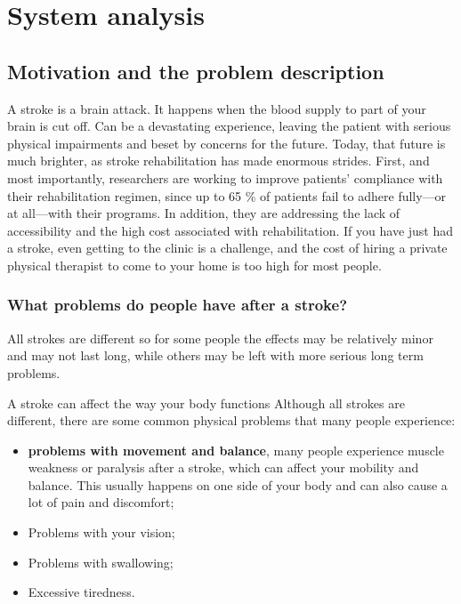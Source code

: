 \section{System analysis}

\subsection{Motivation and the problem description}
A stroke\cite{whatisstroke} is a brain attack. It happens when the blood supply to part of your brain is cut off. Can be a devastating experience, leaving the patient with serious physical impairments and beset by concerns for the future. Today, that future is much brighter, as stroke rehabilitation has made enormous strides. 
First, and most importantly, researchers are working to improve patients’ compliance with their rehabilitation regimen, since up to 65 \% \cite{assesment} of patients fail to adhere fully—or at all—with their programs. In addition, they are addressing the lack of accessibility and the high cost associated with rehabilitation. If you have just had a stroke, even getting to the clinic is a challenge, and the cost of hiring a private physical therapist to come to your home is too high for most people.

\subsubsection{What problems do people have after a stroke?}

All strokes are different so for some people the effects may be relatively minor and may not last long, while others may be left with more serious long term problems.

A stroke can affect the way your body functions
Although all strokes are different, there are some common physical problems that many people experience:

\begin{itemize}
\item \textbf{problems with movement and balance}, many people experience muscle weakness or paralysis after a stroke, which can affect your mobility and balance. This usually happens on one side of your body and can also cause a lot of pain and discomfort;
\item Problems with your vision;
\item Problems with swallowing;
\item Excessive tiredness.
\end{itemize}

